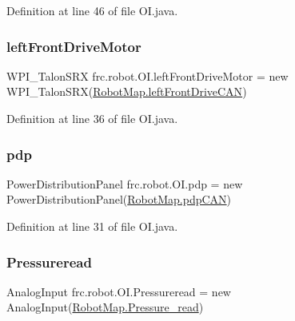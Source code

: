 Definition at line 46 of file O\+I.\+java.

\mbox{\label{classfrc_1_1robot_1_1OI_a3f39e281419ebd60b94126e87e3ec81d}} 
\subsubsection{\texorpdfstring{left\+Front\+Drive\+Motor}{leftFrontDriveMotor}}
{\footnotesize\ttfamily W\+P\+I\+\_\+\+Talon\+S\+RX frc.\+robot.\+O\+I.\+left\+Front\+Drive\+Motor = new W\+P\+I\+\_\+\+Talon\+S\+RX(\hyperlink{classfrc_1_1robot_1_1RobotMap_a2e3dbfb148d6fa2b7f430614887217f0}{Robot\+Map.\+left\+Front\+Drive\+C\+AN})\hspace{0.3cm}{\ttfamily [static]}}



Definition at line 36 of file O\+I.\+java.

\mbox{\label{classfrc_1_1robot_1_1OI_a98d90326dfdaf14238d2f81c20c55f3f}} 
\subsubsection{\texorpdfstring{pdp}{pdp}}
{\footnotesize\ttfamily Power\+Distribution\+Panel frc.\+robot.\+O\+I.\+pdp = new Power\+Distribution\+Panel(\hyperlink{classfrc_1_1robot_1_1RobotMap_af7db1426412719318df15f9838b70198}{Robot\+Map.\+pdp\+C\+AN})\hspace{0.3cm}{\ttfamily [static]}}



Definition at line 31 of file O\+I.\+java.

\mbox{\label{classfrc_1_1robot_1_1OI_a763d5acad9b29d4b29b0fff838059571}} 
\subsubsection{\texorpdfstring{Pressureread}{Pressureread}}
{\footnotesize\ttfamily Analog\+Input frc.\+robot.\+O\+I.\+Pressureread = new Analog\+Input(\hyperlink{classfrc_1_1robot_1_1RobotMap_a10cc39db919c29133e2bc774281804b0}{Robot\+Map.\+Pressure\+\_\+read})\hspace{0.3cm}{\ttfamily [static]}}



